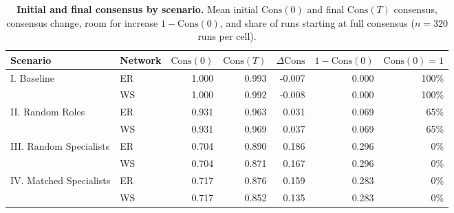 \begin{table}
\centering
\begin{tabular}{llrrrrr}
\toprule
Scenario & Network & $\mathrm{Cons}(0)$ & $\mathrm{Cons}(T)$ & $\Delta\mathrm{Cons}$ & $1-\mathrm{Cons}(0)$ & $\mathrm{Cons}(0)=1$ \\
\midrule
\multirow[c]{2}{*}{I. Baseline} & ER & 1.000 & 0.993 & -0.007 & 0.000 & 100\% \\
 & WS & 1.000 & 0.992 & -0.008 & 0.000 & 100\% \\
\midrule
\multirow[c]{2}{*}{II. Random Roles} & ER & 0.931 & 0.963 & 0.031 & 0.069 & 65\% \\
 & WS & 0.931 & 0.969 & 0.037 & 0.069 & 65\% \\
\midrule
\multirow[c]{2}{*}{III. Random Specialists} & ER & 0.704 & 0.890 & 0.186 & 0.296 & 0\% \\
 & WS & 0.704 & 0.871 & 0.167 & 0.296 & 0\% \\
\midrule
\multirow[c]{2}{*}{IV. Matched Specialists} & ER & 0.717 & 0.876 & 0.159 & 0.283 & 0\% \\
 & WS & 0.717 & 0.852 & 0.135 & 0.283 & 0\% \\
\bottomrule
\end{tabular}
\caption{\textbf{Initial and final consensus by scenario.} Mean initial \(\mathrm{Cons}(0)\) and final \(\mathrm{Cons}(T)\) consensus, consensus change, room for increase \(1-\mathrm{Cons}(0)\), and share of runs starting at full consensus (\(n=320\) runs per cell).}
\label{tab:consensus-levels}
\end{table}